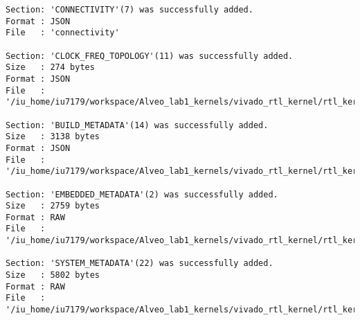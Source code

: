 \begin{lstlisting}[label=func,breaklines=true,breakatwhitespace=false,caption=СОДЕРЖИМОЕ LOG-ФАЙЛА.]
Section: 'CONNECTIVITY'(7) was successfully added.
Format : JSON
File   : 'connectivity'

Section: 'CLOCK_FREQ_TOPOLOGY'(11) was successfully added.
Size   : 274 bytes
Format : JSON
File   : '/iu_home/iu7179/workspace/Alveo_lab1_kernels/vivado_rtl_kernel/rtl_kernel_wizard_0_ex/exports/_x/link/int/vinc_xml.rtd'

Section: 'BUILD_METADATA'(14) was successfully added.
Size   : 3138 bytes
Format : JSON
File   : '/iu_home/iu7179/workspace/Alveo_lab1_kernels/vivado_rtl_kernel/rtl_kernel_wizard_0_ex/exports/_x/link/int/vinc_build.rtd'

Section: 'EMBEDDED_METADATA'(2) was successfully added.
Size   : 2759 bytes
Format : RAW
File   : '/iu_home/iu7179/workspace/Alveo_lab1_kernels/vivado_rtl_kernel/rtl_kernel_wizard_0_ex/exports/_x/link/int/vinc.xml'

Section: 'SYSTEM_METADATA'(22) was successfully added.
Size   : 5802 bytes
Format : RAW
File   : '/iu_home/iu7179/workspace/Alveo_lab1_kernels/vivado_rtl_kernel/rtl_kernel_wizard_0_ex/exports/_x/link/int/systemDiagramModelSlrBaseAddress.json'


\end{lstlisting}
